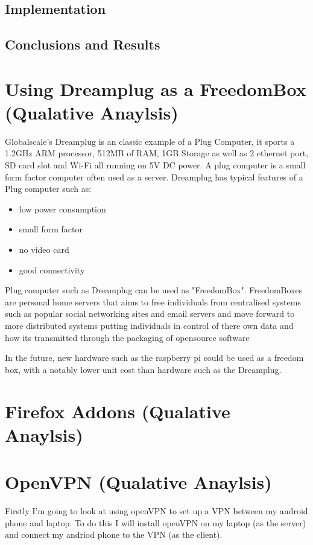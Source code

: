 \documentclass[12pt,a4paper,oneside]{article}
\begin{document}
\subsection{Implementation}

\subsection{Conclusions and Results}


\section{Using Dreamplug as a FreedomBox (Qualative Anaylsis)}

Globalscale's Dreamplug is an classic example of a Plug Computer, it sports a 1.2GHz ARM processor, 512MB of RAM, 1GB Storage as well as 2 ethernet port, SD card slot and Wi-Fi all running on 5V DC power. A plug computer is a small form factor computer often used as a server. Dreamplug has typical features of a Plug computer such as:

\begin{itemize}
\item low power consumption
\item small form factor
\item no video card
\item good connectivity
\end{itemize}

Plug computer such as Dreamplug can be used as "FreedomBox". FreedomBoxes are personal home servers that aims to free individuals from centralised systems such as popular social networking sites and email servers and move forward to more distributed systems putting individuals in control of there own data and how its transmitted through the packaging of opensource software 

In the future, new hardware such as the raspberry pi could be used as a freedom box, with a notably lower unit cost than hardware such as the Dreamplug.

\section{Firefox Addons (Qualative Anaylsis)}

\section{OpenVPN (Qualative Anaylsis)}
Firstly I'm going to look at using openVPN to set up a VPN between my android phone and laptop. To do this I will install openVPN on my laptop (as the server) and connect my andriod phone to the VPN (as the client). 
\end{document}
